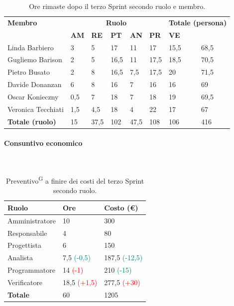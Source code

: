 \documentclass[8pt]{article}
\newcommand{\glossterm}[1]{#1\textsuperscript{G}} %
\newcommand{\subsubsubsection}[1]{\paragraph{#1}\mbox{}\\}
\begin{document}
\begin{table}[ht!]
	\centering
	\begin{tabular}{p{3cm} p{1.4cm} p{1.6cm} p{1.5cm} p{1.5cm} p{1.5cm} p{1.5cm} p{2cm}}
		\toprule
        \textbf{Membro} & \multicolumn{5}{c}{\textbf{Ruolo}} & \multicolumn{2}{r}{\textbf{Totale (persona)}}\\
		& \textbf{AM} & \textbf{RE} & \textbf{PT} & \textbf{AN} & \textbf{PR} & \textbf{VE}\\
		\midrule
        Linda Barbiero     & 3 & 5 & 17 & 11   & 17 & 15,5 & 68,5 \\
        Gugliemo Barison   & 2 & 5 & 16,5 & 11   & 17,5 & 18,5 & 70,5 \\
        Pietro Busato      & 2 & 8 & 16,5 & 7,5 & 17,5 & 20 & 71,5 \\
        Davide Donanzan    & 6 & 8 & 16 & 7   & 16 & 16 & 69 \\
        Oscar Konieczny    & 0,5 & 7 & 18 & 7   & 18 & 19 & 69,5 \\
        Veronica Tecchiati & 1,5 & 4,5 & 18 & 4   & 22 & 17 & 67 \\
        \midrule
        \textbf{Totale (ruolo)} & 15 & 37,5 & 102 & 47,5 & 108 & 106 & 416 \\
		\bottomrule
	\end{tabular}
	\caption{Ore rimaste dopo il terzo Sprint secondo ruolo e membro.}
	\label{table:Ore rimaste dopo il terzo Sprint secondo ruolo e membro.}
\end{table}
\subsubsubsection{Consuntivo economico}
\begin{table}[ht!]
    \centering
    \begin{tabular}{p{4cm} p{1.8cm} p{2.2cm}}
        \toprule
        \textbf{Ruolo} & \textbf{Ore} & \textbf{Costo (€)} \\
        \midrule
        Amministratore & 10 & 300 \\
        Responsabile & 4  & 80 \\
        Progettista & 6  & 150 \\
        Analista & 7,5 \textcolor{teal}{(-0,5)} & 187,5 \textcolor{teal}{(-12,5)}\\
        Programmatore & 14 \textcolor{red}{(-1)} & 210 \textcolor{teal}{(-15)}\\
        Verificatore & 18,5 \textcolor{red}{(+1,5)} & 277,5 \textcolor{red}{(+30)} \\
        \bottomrule
        \textbf{Totale} & 60 & 1205
    \end{tabular}
    \caption{\glossterm{Preventivo} a finire dei costi del terzo Sprint secondo ruolo.}
    \label{table:Preventivo a finire dei costi del terzo Sprint secondo ruolo}
\end{table}
\end{document}
